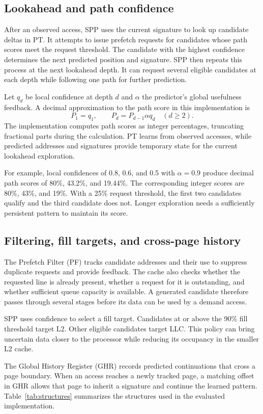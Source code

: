 \documentclass[a4paper,11pt]{article}
\begin{document}
\subsection{Lookahead and path confidence}
After an observed access, SPP uses the current signature to look up candidate deltas in PT. It attempts to issue prefetch requests for candidates whose path scores meet the request threshold. The candidate with the highest confidence determines the next predicted position and signature. SPP then repeats this process at the next lookahead depth. It can request several eligible candidates at each depth while following one path for further prediction.

Let $q_d$ be local confidence at depth $d$ and $\alpha$ the predictor's global usefulness feedback. A decimal approximation to the path score in this implementation is
\[
P_1=q_1,\qquad P_d=P_{d-1}\alpha q_d\quad(d\geq2).
\]
The implementation computes path scores as integer percentages, truncating fractional parts during the calculation. PT learns from observed accesses, while predicted addresses and signatures provide temporary state for the current lookahead exploration.

For example, local confidences of 0.8, 0.6, and 0.5 with $\alpha=0.9$ produce decimal path scores of 80\%, 43.2\%, and 19.44\%. The corresponding integer scores are 80\%, 43\%, and 19\%. With a 25\% request threshold, the first two candidates qualify and the third candidate does not. Longer exploration needs a sufficiently persistent pattern to maintain its score.

\subsection{Filtering, fill targets, and cross-page history}
The Prefetch Filter (PF) tracks candidate addresses and their use to suppress duplicate requests and provide feedback. The cache also checks whether the requested line is already present, whether a request for it is outstanding, and whether sufficient queue capacity is available. A generated candidate therefore passes through several stages before its data can be used by a demand access.

SPP uses confidence to select a fill target. Candidates at or above the 90\% fill threshold target L2. Other eligible candidates target LLC. This policy can bring uncertain data closer to the processor while reducing its occupancy in the smaller L2 cache.

The Global History Register (GHR) records predicted continuations that cross a page boundary. When an access reaches a newly tracked page, a matching offset in GHR allows that page to inherit a signature and continue the learned pattern. Table~\ref{tab:structures} summarizes the structures used in the evaluated implementation.
\end{document}
